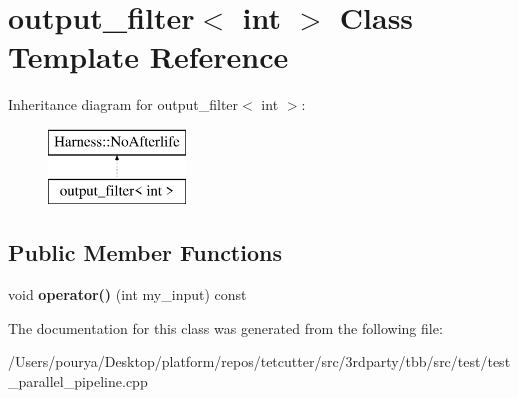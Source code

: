 \hypertarget{classoutput__filter_3_01int_01_4}{}\section{output\+\_\+filter$<$ int $>$ Class Template Reference}
\label{classoutput__filter_3_01int_01_4}
Inheritance diagram for output\+\_\+filter$<$ int $>$\+:\begin{figure}[H]
\begin{center}
\leavevmode
\includegraphics[height=2.000000cm]{classoutput__filter_3_01int_01_4}
\end{center}
\end{figure}
\subsection*{Public Member Functions}
\begin{DoxyCompactItemize}
\item 
\hypertarget{classoutput__filter_3_01int_01_4_aec838a5bd765f5eb441475ac649a01cf}{}void {\bfseries operator()} (int my\+\_\+input) const \label{classoutput__filter_3_01int_01_4_aec838a5bd765f5eb441475ac649a01cf}

\end{DoxyCompactItemize}


The documentation for this class was generated from the following file\+:\begin{DoxyCompactItemize}
\item 
/\+Users/pourya/\+Desktop/platform/repos/tetcutter/src/3rdparty/tbb/src/test/test\+\_\+parallel\+\_\+pipeline.\+cpp\end{DoxyCompactItemize}

